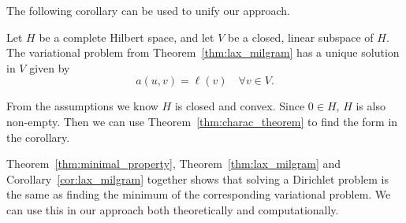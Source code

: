 The following corollary can be used to unify our approach.
\begin{kor}{\quad}
    Let $H$ be a complete Hilbert space, and let $V$ be a closed, linear subspace of $H$. The variational problem from Theorem~\ref{thm:lax_milgram} has a unique solution in $V$ given by\label{cor:lax_milgram}
   \begin{equation*}
    a(u,v) = \ell(v) \quad \forall v \in V.
   \end{equation*}
   \vspace{-8mm}
\end{kor}
\begin{bev}
    From the assumptions we know $H$ is closed and convex. Since $0 \in H$, $H$ is also non-empty. Then we can use Theorem~\ref{thm:charac_theorem} to find the form in the corollary.
\end{bev}
Theorem~\ref{thm:minimal_property}, Theorem~\ref{thm:lax_milgram} and Corollary~\ref{cor:lax_milgram} together shows that solving a Dirichlet problem is 
the same as finding the minimum of the corresponding variational problem. 
We can use this in our approach both theoretically and computationally.